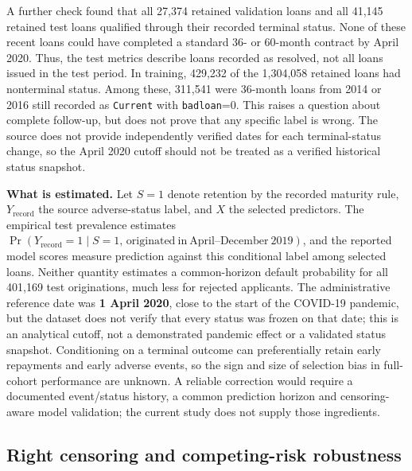 \documentclass[10pt]{article}
\begin{document}
A further check found that all 27,374 retained validation loans and all 41,145 retained test loans qualified through their recorded terminal status. None of these recent loans could have completed a standard 36- or 60-month contract by April 2020. Thus, the test metrics describe loans recorded as resolved, not all loans issued in the test period. In training, 429,232 of the 1,304,058 retained loans had nonterminal status. Among these, 311,541 were 36-month loans from 2014 or 2016 still recorded as \texttt{Current} with \texttt{badloan}=0. This raises a question about complete follow-up, but does not prove that any specific label is wrong. The source does not provide independently verified dates for each terminal-status change, so the April 2020 cutoff should not be treated as a verified historical status snapshot.

\noindent\textbf{What is estimated.} Let $S=1$ denote retention by the recorded maturity rule, $Y_{\mathrm{record}}$ the source adverse-status label, and $X$ the selected predictors. The empirical test prevalence estimates $\Pr(Y_{\mathrm{record}}=1\mid S=1,\,\mathrm{originated\ in\ April\mbox{--}December\ 2019})$, and the reported model scores measure prediction against this conditional label among selected loans. Neither quantity estimates a common-horizon default probability for all 401,169 test originations, much less for rejected applicants. The administrative reference date was \textbf{1 April 2020}, close to the start of the COVID-19 pandemic, but the dataset does not verify that every status was frozen on that date; this is an analytical cutoff, not a demonstrated pandemic effect or a validated status snapshot. Conditioning on a terminal outcome can preferentially retain early repayments and early adverse events, so the sign and size of selection bias in full-cohort performance are unknown. A reliable correction would require a documented event/status history, a common prediction horizon and censoring-aware model validation; the current study does not supply those ingredients.

\subsection{Right censoring and competing-risk robustness}
\label{sec:competingrisk}
\end{document}
